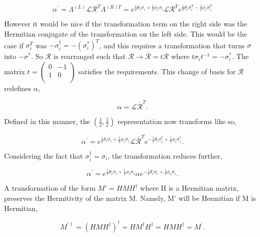 \begin{equation}
\alpha^{'} = \Lambda^{(L)} \mathcal{L} \mathcal{R}^T \Lambda^{(R)T} 
 = e^{\frac{i}{2}\theta_i \sigma_i + \frac{1}{2}\phi_i \sigma_i} \mathcal{L} \mathcal{R}^T e^{\frac{i}{2}\theta_i \sigma_i^T - \frac{1}{2}\phi_i \sigma_i^T} 
\end{equation}

However it would be nice if the transformation term on the right side was the Hermitian conjugate of the transformation on the left side. This would be the case if $\sigma_i^T$ was $-\sigma_i^{\dagger} = -(\sigma_i^{*})^{T}$, and this requires a transformation that turns $\sigma$ into $-\sigma^{*}$. So $\mathcal{R}$ is rearranged such that $\mathcal{R} \rightarrow \bar{\mathcal{R}} = t\mathcal{R}$ where $t\sigma_i t^{-1} = -\sigma_i^{*}$. The matrix $t = \left( \begin{smallmatrix} 0 & -1 \\ 1 & 0 \\ \end{smallmatrix} \right)$ satisfies the requirements. This change of basis for $\mathcal{R}$ redefines $\alpha$,

\begin{equation}
\alpha = \mathcal{L}\bar{\mathcal{R}}^T.
\end{equation}

Defined in this manner, the $(\frac{1}{2}, \frac{1}{2})$ representation now transforms like so,

\begin{equation}
\alpha^{'} = e^{\frac{i}{2}\theta_i \sigma_i + \frac{1}{2}\phi_i \sigma_i} 
\mathcal{L}\bar{\mathcal{R}}^T e^{-\frac{i}{2}\theta_i \sigma_i^\dagger + \frac{1}{2}\phi_i \sigma_i^\dagger}.
\end{equation}

Considering the fact that $\sigma_i^\dagger = \sigma_i$, the transformation reduces further,

\begin{equation}
\alpha^{'} = e^{\frac{i}{2}\theta_i \sigma_i + \frac{1}{2}\phi_i \sigma_i} 
\alpha e^{-\frac{i}{2}\theta_i \sigma_i + \frac{1}{2}\phi_i \sigma_i}.
\end{equation}

A transformation of the form $M' = HMH^\dagger$ where H is a Hermitian matrix, preserves the Hermitivity of the matrix M. Namely, M' will be Hermitian if M is Hermitian, 

\begin{equation}
M^{'\dagger} = (HMH^\dagger)^\dagger = HM^\dagger H^\dagger = HMH^\dagger = M^{'}.
\end{equation}

